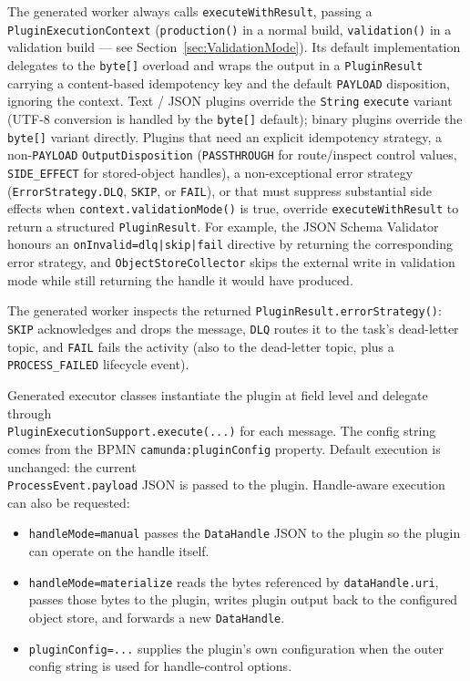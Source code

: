 The generated worker always calls \texttt{executeWithResult}, passing a
\texttt{PluginExecutionContext} (\texttt{production()} in a normal build,
\texttt{validation()} in a validation build --- see Section~\ref{sec:ValidationMode}).
Its default implementation delegates to the \texttt{byte[]} overload and wraps the output
in a \texttt{PluginResult} carrying a content-based idempotency key and the default
\texttt{PAYLOAD} disposition, ignoring the context. Text / JSON plugins override the
\texttt{String} \texttt{execute} variant (UTF-8 conversion is handled by the
\texttt{byte[]} default); binary plugins override the \texttt{byte[]} variant directly.
Plugins that need an explicit idempotency strategy, a non-\texttt{PAYLOAD}
\texttt{OutputDisposition} (\texttt{PASSTHROUGH} for route/inspect control values,
\texttt{SIDE\_EFFECT} for stored-object handles), a non-exceptional error strategy
(\texttt{ErrorStrategy.DLQ}, \texttt{SKIP}, or \texttt{FAIL}), or that must suppress
substantial side effects when \texttt{context.validationMode()} is true, override
\texttt{executeWithResult} to return a structured \texttt{PluginResult}. For
example, the JSON Schema Validator honours an \texttt{onInvalid=dlq|skip|fail}
directive by returning the corresponding error strategy, and
\texttt{ObjectStoreCollector} skips the external write in validation mode while still
returning the handle it would have produced.

The generated worker inspects the returned \texttt{PluginResult.errorStrategy()}:
\texttt{SKIP} acknowledges and drops the message, \texttt{DLQ} routes it to the
task's dead-letter topic, and \texttt{FAIL} fails the activity (also to the
dead-letter topic, plus a \texttt{PROCESS\_FAILED} lifecycle event).

Generated executor classes instantiate the plugin at field level and delegate
through \\ \texttt{PluginExecutionSupport.execute(...)} for each message. The config
string comes from the BPMN \texttt{camunda:pluginConfig} property.
Default execution is unchanged: the current \\ \texttt{ProcessEvent.payload} JSON is
passed to the plugin. Handle-aware execution can also be requested:

\begin{itemize}
\item \texttt{handleMode=manual} passes the \texttt{DataHandle} JSON to the plugin
      so the plugin can operate on the handle itself.
\item \texttt{handleMode=materialize} reads the bytes referenced by
      \texttt{dataHandle.uri}, passes those bytes to the plugin, writes plugin
      output back to the configured object store, and forwards a new
      \texttt{DataHandle}.
\item \texttt{pluginConfig=...} supplies the plugin's own configuration when the
      outer config string is used for handle-control options.
\end{itemize}

